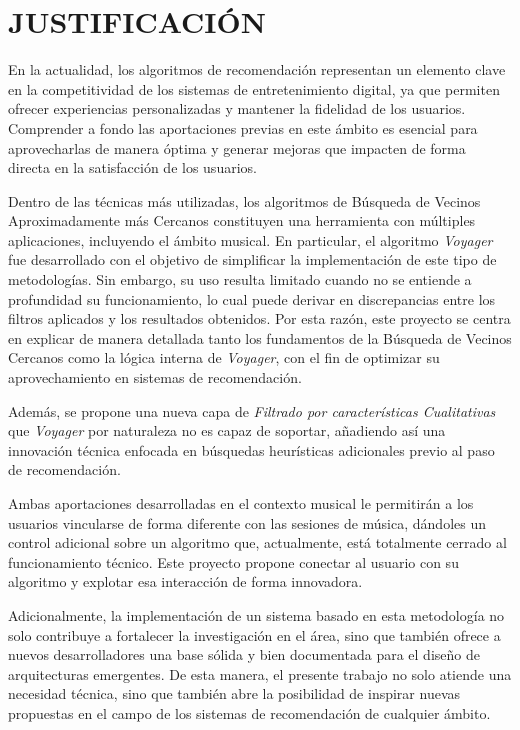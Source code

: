 \section*{JUSTIFICACIÓN}



En la actualidad, los algoritmos de recomendación representan un elemento clave en la competitividad de los sistemas de entretenimiento digital, ya que permiten ofrecer experiencias personalizadas y mantener la fidelidad de los usuarios. Comprender a fondo las aportaciones previas en este ámbito es esencial para aprovecharlas de manera óptima y generar mejoras que impacten de forma directa en la satisfacción de los usuarios.

Dentro de las técnicas más utilizadas, los algoritmos de Búsqueda de Vecinos Aproximadamente más Cercanos constituyen una herramienta con múltiples aplicaciones, incluyendo el ámbito musical. En particular, el algoritmo \textit{Voyager} fue desarrollado con el objetivo de simplificar la implementación de este tipo de metodologías. Sin embargo, su uso resulta limitado cuando no se entiende a profundidad su funcionamiento, lo cual puede derivar en discrepancias entre los filtros aplicados y los resultados obtenidos. Por esta razón, este proyecto se centra en explicar de manera detallada tanto los fundamentos de la Búsqueda de Vecinos Cercanos como la lógica interna de \textit{Voyager}, con el fin de optimizar su aprovechamiento en sistemas de recomendación.

Además, se propone una nueva capa de \textit{Filtrado por características Cualitativas} que \textit{Voyager} por naturaleza no es capaz de soportar, añadiendo así una innovación técnica enfocada en búsquedas heurísticas adicionales previo al paso de recomendación.

Ambas aportaciones desarrolladas en el contexto musical le permitirán a los usuarios vincularse de forma diferente con las sesiones de música, dándoles un control adicional sobre un algoritmo que, actualmente, está totalmente cerrado al funcionamiento técnico. Este proyecto propone conectar al usuario con su algoritmo y explotar esa interacción de forma innovadora.

Adicionalmente, la implementación de un sistema basado en esta metodología no solo contribuye a fortalecer la investigación en el área, sino que también ofrece a nuevos desarrolladores una base sólida y bien documentada para el diseño de arquitecturas emergentes. De esta manera, el presente trabajo no solo atiende una necesidad técnica, sino que también abre la posibilidad de inspirar nuevas propuestas en el campo de los sistemas de recomendación de cualquier ámbito.


